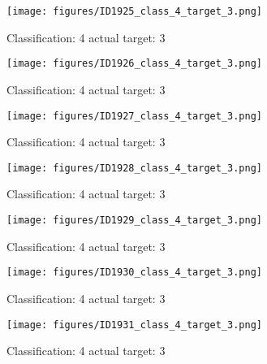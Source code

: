\begin{figure}[h!]
\begin{center}
\texttt{[image: figures/ID1925\_class\_4\_target\_3.png]}
\end{center}
\caption{ Classification: 4 actual target: 3}
\label{fig:ID1925_class_4_target_3}
\end{figure}
\begin{figure}[h!]
\begin{center}
\texttt{[image: figures/ID1926\_class\_4\_target\_3.png]}
\end{center}
\caption{ Classification: 4 actual target: 3}
\label{fig:ID1926_class_4_target_3}
\end{figure}
\begin{figure}[h!]
\begin{center}
\texttt{[image: figures/ID1927\_class\_4\_target\_3.png]}
\end{center}
\caption{ Classification: 4 actual target: 3}
\label{fig:ID1927_class_4_target_3}
\end{figure}
\begin{figure}[h!]
\begin{center}
\texttt{[image: figures/ID1928\_class\_4\_target\_3.png]}
\end{center}
\caption{ Classification: 4 actual target: 3}
\label{fig:ID1928_class_4_target_3}
\end{figure}
\begin{figure}[h!]
\begin{center}
\texttt{[image: figures/ID1929\_class\_4\_target\_3.png]}
\end{center}
\caption{ Classification: 4 actual target: 3}
\label{fig:ID1929_class_4_target_3}
\end{figure}
\begin{figure}[h!]
\begin{center}
\texttt{[image: figures/ID1930\_class\_4\_target\_3.png]}
\end{center}
\caption{ Classification: 4 actual target: 3}
\label{fig:ID1930_class_4_target_3}
\end{figure}
\begin{figure}[h!]
\begin{center}
\texttt{[image: figures/ID1931\_class\_4\_target\_3.png]}
\end{center}
\caption{ Classification: 4 actual target: 3}
\label{fig:ID1931_class_4_target_3}
\end{figure}
